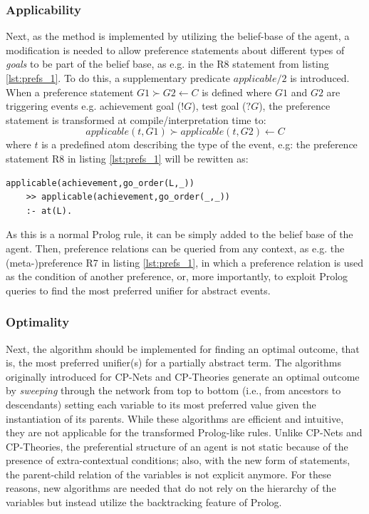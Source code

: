\subsubsection*{Applicability} Next, as the method is implemented by utilizing the belief-base of the agent, a modification is needed to allow preference statements about different types of \textit{goals} to be part of the belief base, as e.g. in the R8 statement from listing \ref{lst:prefs_1}. To do this, a supplementary predicate $applicable/2$ is introduced. When a preference statement $G1 \succ G2 \leftarrow C$ is defined where $G1$ and $G2$ are triggering events e.g. achievement goal ($!G$), test goal ($?G$), the preference statement is transformed at compile/interpretation time to:
\begin{equation*}
applicable(t,G1) \succ applicable(t,G2) \leftarrow C
\end{equation*}
where $t$ is a predefined atom describing the type of the event, e.g: the preference statement R8 in listing \ref{lst:prefs_1} will be rewitten as:
\begin{verbatim}
applicable(achievement,go_order(L,_)) 
    >> applicable(achievement,go_order(_,_)) 
    :- at(L).
\end{verbatim}
As this is a normal Prolog rule, it can be simply added to the belief base of the agent. Then, preference relations can be queried from any context, as e.g. the (meta-)preference R7 in listing \ref{lst:prefs_1}, in which a preference relation is used as the condition of another preference, or, more importantly, to exploit Prolog queries to find the most preferred unifier for abstract events.

\subsubsection*{Optimality}
Next, the algorithm should be implemented for finding an optimal outcome, that is, the most preferred unifier(s) for a partially abstract term. The algorithms originally introduced for CP-Nets and CP-Theories generate an optimal outcome by \textit{sweeping} through the network from top to bottom (i.e., from ancestors to descendants) setting each variable to its most preferred value given the instantiation of its parents. While these algorithms are efficient and intuitive, they are not applicable for the transformed Prolog-like rules. Unlike CP-Nets and CP-Theories, the preferential structure of an agent is not static because of the presence of extra-contextual conditions; also, with the new form of statements, the parent-child relation of the variables is not explicit anymore. For these reasons, new algorithms are needed that do not rely on the hierarchy of the variables but instead utilize the backtracking feature of Prolog. 

